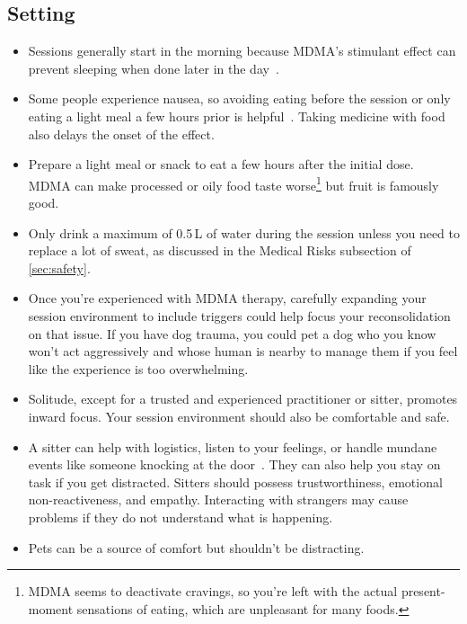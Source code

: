 \documentclass[11pt,oneside]{book}
\let\cite\parencite
\begin{document}
\subsection*{Setting}
\begin{itemize}
    \item Sessions generally start in the morning because MDMA's stimulant effect can prevent sleeping when done later in the day~\cite{berro2018acute}.
    \item Some people experience nausea, so avoiding eating before the session or only eating a light meal a few hours prior is helpful~\cite{colcott2024side}. Taking medicine with food also delays the onset of the effect.
    \item  Prepare a light meal or snack to eat a few hours after the initial dose. MDMA can make processed or oily food taste worse\footnote{MDMA seems to deactivate cravings, so you're left with the actual present-moment sensations of eating, which are unpleasant for many foods.} but fruit is famously good.
    \item Only drink a maximum of 0.5\,L of water during the session unless you need to replace a lot of sweat, as discussed in the Medical Risks subsection of \cref{sec:safety}.
    \item \label{contextexpansion} Once you're experienced with MDMA therapy, carefully expanding your session environment to include triggers could help focus your reconsolidation on that issue. If you have dog trauma, you could pet a dog who you know won't act aggressively and whose human is nearby to manage them if you feel like the experience is too overwhelming.
    \item Solitude, except for a trusted and experienced practitioner or sitter, promotes inward focus. Your session environment should also be comfortable and safe.
    \item A sitter can help with logistics, listen to your feelings, or handle mundane events like someone knocking at the door~\cite{thalSitter}. They can also help you stay on task if you get distracted. Sitters should possess trustworthiness, emotional non-reactiveness, and empathy. Interacting with strangers may cause problems if they do not understand what is happening.
    \item Pets can be a source of comfort but shouldn't be distracting.
\end{itemize}
\end{document}
